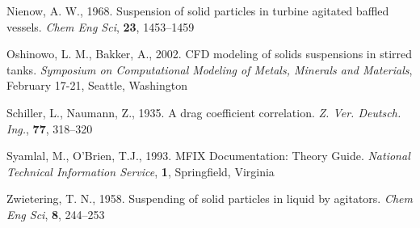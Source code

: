 \begin{thebibliography}{99}
 Nienow, A. W., 1968. Suspension of solid particles in turbine agitated baffled vessels. \textit{Chem Eng Sci}, \textbf{23}, 1453--1459 

 Oshinowo, L. M., Bakker, A., 2002. CFD modeling of solids suspensions in stirred tanks. \textit{Symposium on Computational Modeling of Metals, Minerals and Materials}, February 17-21, Seattle, Washington 

 Schiller, L., Naumann, Z., 1935. A drag coefficient correlation. \textit{Z. Ver. Deutsch. Ing.}, \textbf{77}, 318--320

 Syamlal, M., O'Brien, T.J., 1993. MFIX Documentation: Theory Guide. \textit{National Technical Information Service}, \textbf{1}, Springfield, Virginia 

 Zwietering, T. N., 1958. Suspending of solid particles in liquid by agitators. \textit{Chem Eng Sci}, \textbf{8}, 244--253 

\end{thebibliography}
